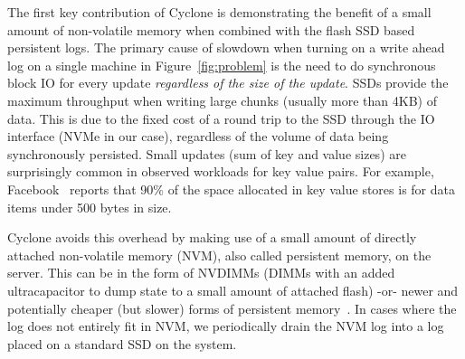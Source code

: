 \documentclass[twocolumn]{article}
\begin{document}
The first key contribution of Cyclone is demonstrating the benefit of a small
amount of non-volatile memory when combined with the flash SSD based persistent
logs.  The primary cause of slowdown when turning on a write ahead log on a
single machine in Figure~\ref{fig:problem} is the need to do synchronous block
IO for every update \emph{regardless of the size of the update}. SSDs provide
the maximum throughput when writing large chunks (usually more than 4KB) of
data. This is due to the fixed cost of a round trip to the SSD through the IO
interface (NVMe in our case), regardless of the volume of data being
synchronously persisted. Small updates (sum of key and value sizes) are
surprisingly common in observed workloads for key value pairs. For example,
Facebook~\cite{fb_workload_analysis} reports that 90\% of the space allocated in
key value stores is for data items under 500 bytes in size.

Cyclone avoids this overhead by making use of a small amount of directly
attached non-volatile memory (NVM), also called persistent memory, on the
server.  This can be in the form of NVDIMMs (DIMMs with an added ultracapacitor
to dump state to a small amount of attached flash) -or- newer and potentially
cheaper (but slower) forms of persistent memory~\cite{pmfs}.
In cases where the log does not entirely fit in NVM, we periodically drain the
NVM log into a log placed on a standard SSD on the system.
\end{document}
